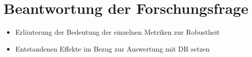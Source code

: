 \section{Beantwortung der Forschungsfrage}

\begin{itemize}
    \item Erläuterung der Bedeutung der einzelnen Metriken zur Robustheit
    \item Entstandenen Effekte im Bezug zur Auswertung mit DR setzen
\end{itemize}